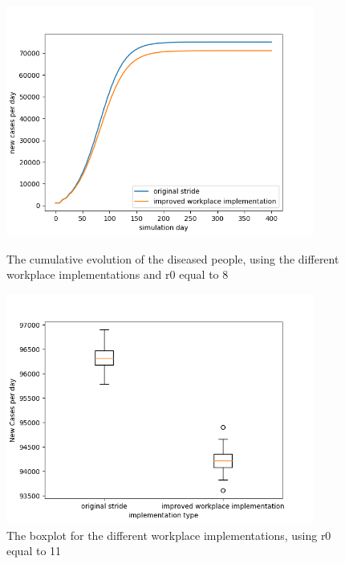 \documentclass[runningheads]{llncs}
\begin{document}
	\begin{figure}
		\centering
		\includegraphics[width=0.9\textwidth]{workplace_r08_cumul.png}
		\caption{The cumulative evolution of the diseased people, using the different workplace implementations and r0 equal to 8}	
		\label{fig2}
		\includegraphics[width=0.9\textwidth]{workplace_r11_boxplot.png}	
		\caption{The boxplot for the different workplace implementations, using r0 equal to 11}
		\label{fig3}
	\end{figure}
\end{document}
